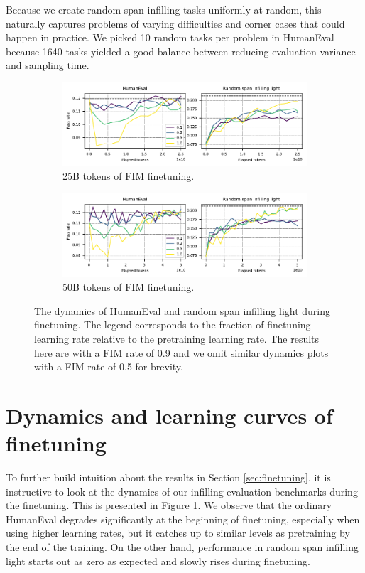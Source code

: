 \documentclass[postscript]{article}
\begin{document}
Because we create random span infilling tasks uniformly at random, this naturally captures problems of varying difficulties and corner cases that could happen in practice. We picked 10 random tasks per problem in HumanEval because 1640 tasks yielded a good balance between reducing evaluation variance and sampling time.




\begin{figure}[ht!]
\centering
    \begin{subfigure}[b]{\textwidth}
        \centering
        \includegraphics[width=\textwidth]{figures/ft_dynamics_tb25.pdf}
        \caption{25B tokens of FIM finetuning.}
    \end{subfigure}
    \begin{subfigure}[b]{\textwidth}
        \centering
        \includegraphics[width=\textwidth]{figures/ft_dynamics_tb50.pdf}
        \caption{50B tokens of FIM finetuning.}
    \end{subfigure}
\caption{The dynamics of HumanEval and random span infilling light during finetuning. The legend corresponds to 
the fraction of finetuning
learning rate relative to the pretraining learning rate.  The results here are with a FIM rate of 0.9 and we omit similar dynamics plots with a FIM rate of 0.5 for brevity. } \label{fig:finetuning_dynamic}
\end{figure}

\section{Dynamics and learning curves of finetuning}\label{appendix:ft_dynamic}
To further build intuition about the results in Section \ref{sec:finetuning}, it is instructive to look at the dynamics of our infilling evaluation benchmarks during the finetuning. This is presented in Figure \ref{fig:finetuning_dynamic}. We observe that the ordinary HumanEval degrades significantly at the beginning of finetuning, especially  when using higher learning rates,  but it catches up to similar levels as pretraining by the end of the training. On the other hand, performance in random span infilling light starts out as zero as expected and slowly rises during finetuning.
\end{document}
